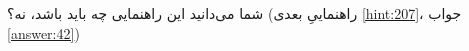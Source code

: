 \section{}
\paragraph{}\label{hint:52}
شما می‌دانید این راهنمایی چه باید باشد، نه؟ (راهنماییِ بعدی \ref{hint:207}، جواب \ref{answer:42})